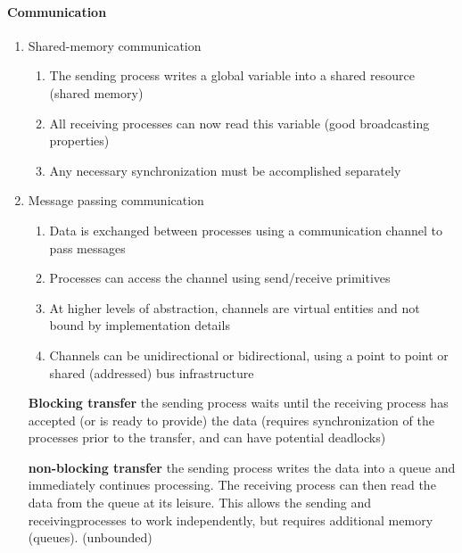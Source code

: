 \documentclass[english]{latex4ei/latex4ei_sheet}
\begin{document}
\paragraph{Communication}
\begin{enumerate}
  \item Shared-memory communication
    \begin{enumerate}
      \item The sending process writes a global variable into a shared resource (shared memory)
      \item All receiving processes can now read this variable (good broadcasting properties)
      \item Any necessary synchronization must be accomplished separately
    \end{enumerate}
  \item Message passing communication
    \begin{enumerate}
    	\item Data is exchanged between processes using a communication channel to pass messages
	\item Processes can access the channel using send/receive primitives
	\item At higher levels of abstraction, channels are virtual entities and not bound by implementation details
	\item  Channels can be unidirectional or bidirectional, using a point to point or shared (addressed) bus infrastructure
    \end{enumerate}

    \textbf{Blocking transfer} the sending process waits until the receiving process has accepted (or is ready to provide) the data (requires synchronization of the processes prior to the transfer, and can have potential deadlocks)

    \textbf{non-blocking transfer} the sending process writes the data into a queue and immediately continues processing. The receiving process can then read the data from the queue at its leisure. This allows the sending and receivingprocesses to work independently, but requires additional memory (queues). (unbounded)
\end{enumerate}
\end{document}

